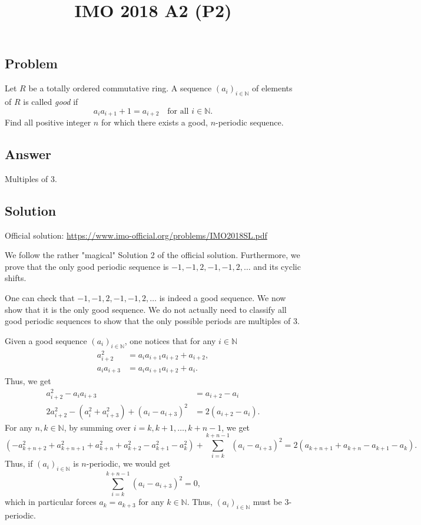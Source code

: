 \documentclass{article}
\title{IMO 2018 A2 (P2)}
\author{}
\date{}
\newcommand{\N}{\mathbb{N}}
\begin{document}
\maketitle



\subsection*{Problem}

Let $R$ be a totally ordered commutative ring.
A sequence $(a_i)_{i \in \N}$ of elements of $R$ is called \emph{good} if
\[ a_i a_{i + 1} + 1 = a_{i + 2} \quad \text{for all } i \in \N. \tag{*}\label{2018a2-eq0} \]
Find all positive integer $n$ for which there exists a good, $n$-periodic sequence.



\subsection*{Answer}

Multiples of $3$.



\subsection*{Solution}

Official solution: \url{https://www.imo-official.org/problems/IMO2018SL.pdf}

We follow the rather "magical" Solution 2 of the official solution.
Furthermore, we prove that the only good periodic sequence is $-1, -1, 2, -1, -1, 2, \ldots$ and its cyclic shifts. 

One can check that $-1, -1, 2, -1, -1, 2, \ldots$ is indeed a good sequence.
We now show that it is the only good sequence.
We do not actually need to classify all good periodic sequences to show that the only possible periods are multiples of $3$.

Given a good sequence $(a_i)_{i \in \N}$, one notices that for any $i \in \N$
\begin{align*}
    a_{i + 2}^2 &= a_i a_{i + 1} a_{i + 2} + a_{i + 2}, \\
    a_i a_{i + 3} &= a_i a_{i + 1} a_{i + 2} + a_i.
\end{align*}
Thus, we get
\begin{align*}
    a_{i + 2}^2 - a_i a_{i + 3} &= a_{i + 2} - a_i \\
    2 a_{i + 2}^2 - (a_i^2 + a_{i + 3}^2) + (a_i - a_{i + 3})^2 &= 2 (a_{i + 2} - a_i).
\end{align*}
For any $n, k \in \N$, by summing over $i = k, k + 1, \ldots, k + n - 1$, we get
\[ (-a_{k + n + 2}^2 + a_{k + n + 1}^2 + a_{k + n}^2 + a_{k + 2}^2 - a_{k + 1}^2 - a_k^2) + \sum_{i = k}^{k + n - 1} (a_i - a_{i + 3})^2 = 2 (a_{k + n + 1} + a_{k + n} - a_{k + 1} - a_k). \]
Thus, if $(a_i)_{i \in \N}$ is $n$-periodic, we would get
\[ \sum_{i = k}^{k + n - 1} (a_i - a_{i + 3})^2 = 0, \]
    which in particular forces $a_k = a_{k + 3}$ for any $k \in \N$.
Thus, $(a_i)_{i \in \N}$ must be $3$-periodic.
\end{document}
